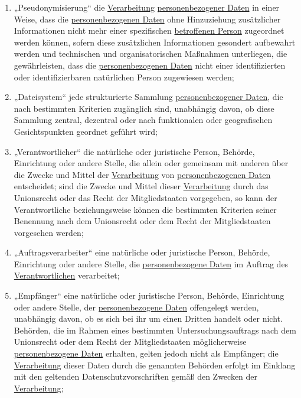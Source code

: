 \begin{enumerate}
  \item „Pseudonymisierung“ die \hyperref[itm:04-2]{Verarbeitung} \hyperref[itm:04-1]{personenbezogener Daten} in einer Weise, dass die \hyperref[itm:04-1]{personenbezogenen Daten}
   ohne Hinzuziehung zusätzlicher Informationen nicht mehr einer spezifischen \hyperref[itm:04-1]{betroffenen Person} zugeordnet werden
   können, sofern diese zusätzlichen Informationen gesondert aufbewahrt werden und technischen und organisatorischen
   Maßnahmen unterliegen, die gewährleisten, dass die \hyperref[itm:04-1]{personenbezogenen Daten} nicht einer identifizierten oder
   identifizierbaren natürlichen Person zugewiesen werden;
  \label{itm:04-5}

  \item „Dateisystem“ jede strukturierte Sammlung \hyperref[itm:04-1]{personenbezogener Daten}, die nach bestimmten Kriterien zugänglich
   sind, unabhängig davon, ob diese Sammlung zentral, dezentral oder nach funktionalen oder geografischen
   Gesichtspunkten geordnet geführt wird;
  \label{itm:04-6}

  \item „Verantwortlicher“ die natürliche oder juristische Person, Behörde, Einrichtung oder andere Stelle, die allein
   oder gemeinsam mit anderen über die Zwecke und Mittel der \hyperref[itm:04-2]{Verarbeitung} von \hyperref[itm:04-1]{personenbezogenen Daten} entscheidet; sind
   die Zwecke und Mittel dieser \hyperref[itm:04-2]{Verarbeitung} durch das Unionsrecht oder das Recht der Mitgliedstaaten vorgegeben, so
   kann der Verantwortliche beziehungsweise können die bestimmten Kriterien seiner Benennung nach dem Unionsrecht oder
   dem Recht der Mitgliedstaaten vorgesehen werden;
  \label{itm:04-7}

  \item „Auftragsverarbeiter“ eine natürliche oder juristische Person, Behörde, Einrichtung oder andere Stelle, die
   \hyperref[itm:04-1]{personenbezogene Daten} im Auftrag des \hyperref[itm:04-7]{Verantwortlichen} verarbeitet;
  \label{itm:04-8}

  \item „Empfänger“ eine natürliche oder juristische Person, Behörde, Einrichtung oder andere Stelle, der
   \hyperref[itm:04-1]{personenbezogene Daten} offengelegt werden, unabhängig davon, ob es sich bei ihr um einen Dritten handelt oder nicht.
   Behörden, die im Rahmen eines bestimmten Untersuchungsauftrags nach dem Unionsrecht oder dem Recht der
   Mitgliedstaaten möglicherweise \hyperref[itm:04-1]{personenbezogene Daten} erhalten, gelten jedoch nicht als Empfänger; die \hyperref[itm:04-2]{Verarbeitung}
   dieser Daten durch die genannten Behörden erfolgt im Einklang mit den geltenden Datenschutzvorschriften gemäß den
   Zwecken der \hyperref[itm:04-2]{Verarbeitung};
  \label{itm:04-9}


\end{enumerate}
